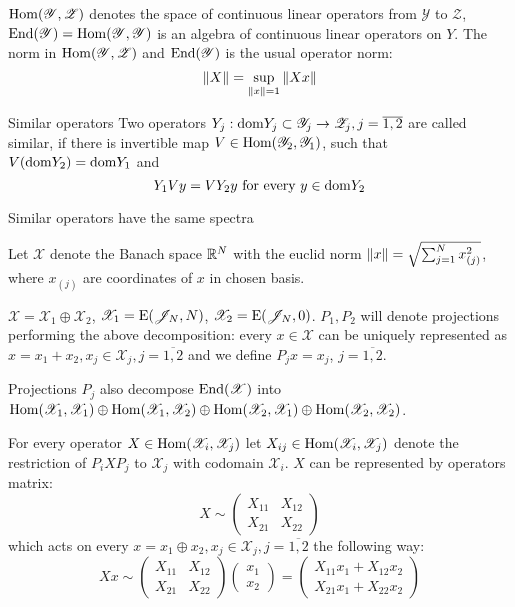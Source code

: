 \documentclass{article}
\begin{document}
\( \mathrm{Hom}({\mathscr Y},{\mathscr Z}) \) denotes the space of continuous linear operators
from \( \mathscr Y \) to \( \mathscr Z \),
\( \mathrm{End}({\mathscr Y}) = \mathrm{Hom}({\mathscr Y},{\mathscr Y}) \) is an algebra of continuous linear operators on \( Y \).
The norm in \( \mathrm{Hom}({\mathscr Y},{\mathscr Z}) \) and \( \mathrm{End}({\mathscr Y}) \) is the usual operator norm:
\[\left\|{X}\right\| = \sup_{\left\|{x}\right\| = 1}{\left\|{X x}\right\|}\]
\begin{dfn}{Similar operators}
    Two operators \( Y_j:\mathrm{dom} {Y_j}\subset\mathscr Y_j\to\mathscr Z_j, j=\overline{1,2} \) are called similar,
    if there is invertible map \( V\in\mathrm{Hom}({\mathscr Y_2},{\mathscr Y_1}) \),
    such that \( V(\mathrm{dom} {Y_2}) = \mathrm{dom} {Y_1} \) and
    \[Y_1 V y = V Y_2 y \text{ for every } y\in\mathrm{dom} {Y_2}\]
\end{dfn}
\begin{propose}
    Similar operators have the same spectra
\end{propose}

Let \( \mathscr X \) denote the Banach space \( \mathbb{R}^N \) with the euclid norm
\( \left\|{x}\right\| = \sqrt{\sum_{j=1}^N x_{(j)}^2} \), where \( x_{(j)} \) are coordinates of \( x \) in chosen basis.

\( \mathscr X = \mathscr X_1 \oplus \mathscr X_2 \),
\( \mathscr X_1 = \mathrm{E}({\mathscr{J}_{N}}, {N}) \),
\( \mathscr X_2 = \mathrm{E}({\mathscr{J}_{N}}, {0}) \).
\( P_1, P_2 \) will denote projections performing the above decomposition:
every \( x\in\mathscr X \) can be uniquely represented as \( x = x_1 + x_2, x_j\in\mathscr X_j,j=\overline{1,2} \)
and we define \( P_j x = x_j \), \( j=\overline{1,2} \).

Projections \( P_j \) also decompose \( \mathrm{End}({\mathscr X}) \) into
\( \mathrm{Hom}({\mathscr X_1},{\mathscr X_1})
    \oplus \mathrm{Hom}({\mathscr X_1},{\mathscr X_2})
    \oplus \mathrm{Hom}({\mathscr X_2},{\mathscr X_1})
    \oplus \mathrm{Hom}({\mathscr X_2},{\mathscr X_2}) \).

For every operator \( X\in\mathrm{Hom}({\mathscr X_i},{\mathscr X_j}) \)
let \( X_{ij} \in \mathrm{Hom}({\mathscr X_i},{\mathscr X_j}) \)
denote the restriction of \( P_i X P_j \) to \( \mathscr X_j \) with codomain \( \mathscr X_i \).
\( X \) can be represented by operators matrix:
\[X \sim \begin{pmatrix}
    X_{11} & X_{12} \\
    X_{21} & X_{22}
\end{pmatrix}\]
which acts on every \( x = x_1 \oplus x_2, x_j\in\mathscr X_j,j=\overline{1,2} \) the following way:
\[
X x \sim
\begin{pmatrix}
    X_{11} & X_{12} \\
    X_{21} & X_{22}
\end{pmatrix}
\begin{pmatrix} x_1 \\ x_2 \end{pmatrix}
= \begin{pmatrix}
    X_{11} x_1 + X_{12} x_2 \\
    X_{21} x_1 + X_{22} x_2
\end{pmatrix}
\]
\end{document}
